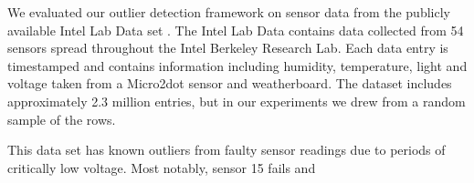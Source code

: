 
We evaluated our outlier detection framework on sensor data from the publicly available Intel Lab Data set \cite{IntelLabData}.
The Intel Lab Data contains data collected from 54 sensors spread throughout the Intel Berkeley Research Lab.
Each data entry is timestamped and contains information including humidity, temperature, light and voltage taken from a Micro2dot sensor and weatherboard.
The dataset includes approximately 2.3 million entries, but in our experiments we drew from a random sample of the rows.

This data set has known outliers from faulty sensor readings due to periods of critically low voltage.
Most notably, sensor 15 fails and 
